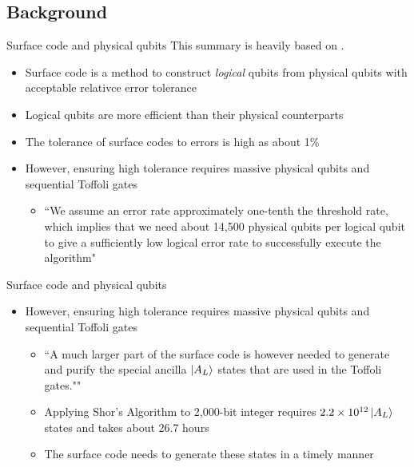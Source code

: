 \documentclass{beamer}
\begin{document}
    \subsection{Background}
    \begin{frame}{Surface code and physical qubits}
        This summary is heavily based on \cite{Fowler_2012}.
        \begin{itemize}
            \item Surface code is a method to construct \textit{logical} qubits from physical qubits with acceptable relativce error tolerance \cite{calderbank1997quantum}
            \item Logical qubits are more efficient than their physical counterparts
            \item The tolerance of surface codes to errors is high as about 1\%
            \item However, ensuring high tolerance requires massive physical qubits and sequential Toffoli gates
            \begin{itemize}
                \item ``We assume an error rate approximately one-tenth the threshold rate, which implies that we need about 14,500 physical qubits per logical qubit to give a sufficiently low logical error rate to successfully execute the algorithm"
            \end{itemize}
        \end{itemize}
    \end{frame}
    
    \begin{frame}{Surface code and physical qubits}
        \begin{itemize}
            \item However, ensuring high tolerance requires massive physical qubits and sequential Toffoli gates
            \begin{itemize}
                \item ``A much larger part of the surface code is however needed to generate and purify the special ancilla $\ket{A_L}$ states that are used in the Toffoli gates.""
                \item Applying Shor's Algorithm to 2,000-bit integer requires $ 2.2 \times 10^{12} \ket{A_L}$ states and takes about 26.7 hours
                \item The surface code needs to generate these states in a timely manner
            \end{itemize}
        \end{itemize}
    \end{frame}
    
\end{document}
